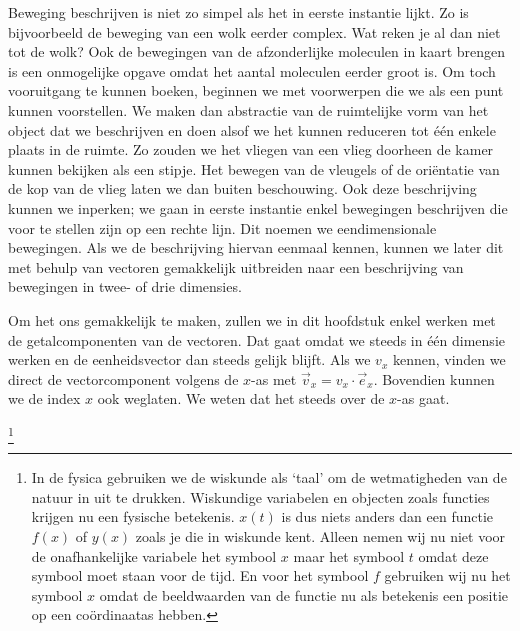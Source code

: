 \documentclass{ximera}
\begin{document}
	\author{Bart Lambregs}
    \xmsource


	Beweging beschrijven is niet zo simpel als het in eerste instantie lijkt. Zo is bijvoorbeeld de beweging van een wolk eerder complex. Wat reken je al dan niet tot de wolk? Ook de bewegingen van de afzonderlijke moleculen in kaart brengen is een onmogelijke opgave omdat het aantal moleculen eerder groot is. Om toch vooruitgang te kunnen boeken, beginnen we met voorwerpen die we als een punt kunnen voorstellen. We maken dan abstractie van de ruimtelijke vorm van het object dat we beschrijven en doen alsof we het kunnen reduceren tot \'e\'en enkele plaats in de ruimte. Zo zouden we het vliegen van een vlieg doorheen de kamer kunnen bekijken als een stipje. Het bewegen van de vleugels of de oriëntatie van de kop van de vlieg laten we dan buiten beschouwing. Ook deze beschrijving kunnen we inperken; we gaan in eerste instantie enkel bewegingen beschrijven die voor te stellen zijn op een rechte lijn. Dit noemen we eendimensionale bewegingen. Als we de beschrijving hiervan eenmaal kennen, kunnen we later dit met behulp van vectoren gemakkelijk uitbreiden naar een beschrijving van bewegingen in twee- of drie dimensies.
	
	Om het ons gemakkelijk te maken, zullen we in dit hoofdstuk enkel werken met de getalcomponenten van de vectoren. Dat gaat omdat we steeds in \'e\'en dimensie werken en de eenheidsvector dan steeds gelijk blijft. Als we $v_x$ kennen, vinden we direct de vectorcomponent volgens de $x$-as met $\vec{v}_x=v_x\cdot\vec{e}_x$. Bovendien kunnen we de index $x$ ook weglaten. We weten dat het steeds over de $x$-as gaat.
	
	
	\footnote{In de fysica gebruiken we de wiskunde als `taal' om de wetmatigheden van de natuur in uit te drukken. Wiskundige variabelen en objecten zoals functies krijgen nu een fysische betekenis. $x(t)$ is dus niets anders dan een functie $f(x)$ of $y(x)$ zoals je die in wiskunde kent. Alleen nemen wij nu niet voor de onafhankelijke variabele het symbool $x$ maar het symbool $t$ omdat deze symbool moet staan voor de tijd. En voor het symbool $f$ gebruiken wij nu het symbool $x$ omdat de beeldwaarden van de functie nu als betekenis een positie op een coördinaatas hebben.}
	
\end{document}
